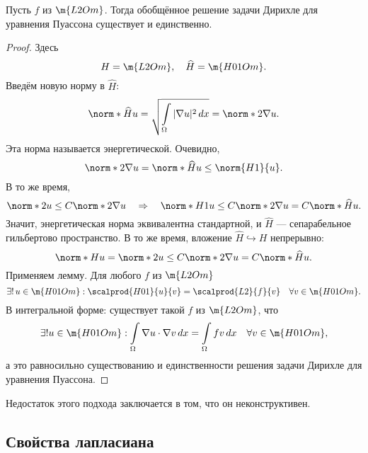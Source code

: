 \begin{theorem} Пусть $f$ из $\m{L2Om}$. Тогда обобщённое решение задачи Дирихле для уравнения Пуассона существует и единственно.
\end{theorem}
\begin{proof} Здесь
$$ H = \m{L2Om}, \quad \widehat{H} = \m{H01Om}.$$
Введём новую норму в $\widehat{H}$:
$$\norm*{\widehat{H}}{u} = \sqrt{\int \limits_\Omega | \nabla u |^2 \, dx } = \norm*{2}{\nabla u}.$$
Эта норма называется энергетической. Очевидно,
$$ \norm*{2}{\nabla u} = \norm*{\widehat{H}}{u} \leq \norm{H1}{u}.$$
В то же время,
$$ \norm*{2}{u} \leq C \norm*{2}{\nabla u} \quad \Rightarrow \quad \norm*{H1}{u} \leq C \norm*{2}{\nabla u} = C \norm*{\widehat{H}}{u}.$$
Значит, энергетическая норма эквивалентна стандартной, и $\widehat{H}$ --- сепарабельное гильбертово пространство. В то же время, вложение $\widehat{H} \hookrightarrow H$ непрерывно:
$$ \norm*{H}{u} = \norm*{2}{u} \leq C \norm*{2}{\nabla u} = C \norm*{\widehat{H}}{u}.$$
Применяем лемму. Для любого $f$ из $\m{L2Om}$ 
$$ \exists! \, u \in \m{H01Om}: \scalprod{H01}{u}{v} = \scalprod{L2}{f}{v} \quad \forall v \in \m{H01Om}.$$
В интегральной форме: существует такой $f$ из $\m{L2Om}$, что
$$ \exists ! u \in \m{H01Om} : \int \limits_\Omega \nabla u \cdot \nabla v \, dx = \int \limits_\Omega f v \, dx \quad \forall v \in \m{H01Om},$$
а это равносильно существованию и единственности решения задачи Дирихле для уравнения Пуассона.

\end{proof}

Недостаток этого подхода заключается в том, что он неконструктивен.

\subsection{Свойства лапласиана}

